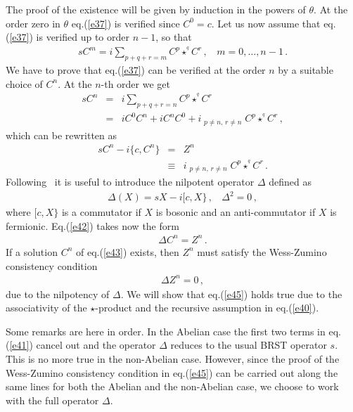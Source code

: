 \documentclass[a4paper,12pt]{article}
\newcommand{\stargr}[1]{\star^{\!\!\!^#1}}
\begin{document}
The proof of the existence will be given by induction in the powers of 
 $\theta$.
At the order zero in $\theta$ eq.(\ref{e37}) is verified since $C^0=c$.
Let us now assume that eq.(\ref{e37}) is verified up to order $n-1$,
 so that 
%
\begin{eqnarray}
s C^m = i \sum_{p+q+r=m} C^p \stargr{q} C^r \, , ~~~~ m = 0,\dots,n-1 \, .
\label{e40}
\end{eqnarray}
%
We have to prove that eq.(\ref{e37}) can be verified at the order $n$
 by a suitable choice of $C^n$. At the $n$-th order we get
%
\begin{eqnarray}
s C^n & = & i \sum_{p+q+r=n} C^p \stargr{q} C^r \nonumber \\
      & = & i C^0 C^n + i C^n C^0 
            + i \mathop{\sum_{p+q+r=n}}_{p \not =n, \, r \not = n}
            C^p \stargr{q} C^r \, ,
\label{e41}
\end{eqnarray}
%
which can be rewritten as
%
\begin{eqnarray}
s C^n - i\{ c , C^n \} & = & Z^n \nonumber \\
& \equiv &  i \mathop{\sum_{p+q+r=n}}_{p \not =n, \, r \not = n }
            C^p \stargr{q} C^r \, .
\label{e42}
\end{eqnarray}
%
Following~\cite{Brace:2001fj} it is useful to introduce the nilpotent 
 operator $\Delta$ defined as
%
\begin{eqnarray}
\Delta(X) = sX - i [ c, X \} \, ,~~~~\Delta^2=0\,,
\label{e43}
\end{eqnarray}
%
where $[ c, X \}$ is a commutator if $X$ is bosonic and
 an anti-commutator if $X$ is fermionic.
Eq.(\ref{e42}) takes now the form
%
\begin{eqnarray}
\Delta C^n = Z^n \, .
\label{e44}
\end{eqnarray}
%
If a solution $C^n$ of eq.(\ref{e43}) exists, then $Z^n$ must satisfy
 the Wess-Zumino consistency condition
%
\begin{eqnarray}
\Delta Z^n = 0\, ,
\label{e45}
\end{eqnarray}
%
due to the nilpotency of $\Delta$.
We will show that eq.(\ref{e45}) holds true due to the associativity
 of the $\star$-product and the recursive assumption in eq.(\ref{e40}).

Some remarks are here in order. In the Abelian case the first two terms in 
 eq.(\ref{e41}) cancel out and the operator $\Delta$ reduces to the usual
 BRST operator $s$.
This is no more true in the non-Abelian case.
However, since the proof of the Wess-Zumino consistency condition 
 in eq.(\ref{e45}) can be carried out along the same lines for both
 the Abelian and the non-Abelian case, we choose to work with the full
 operator $\Delta$.
\end{document}
